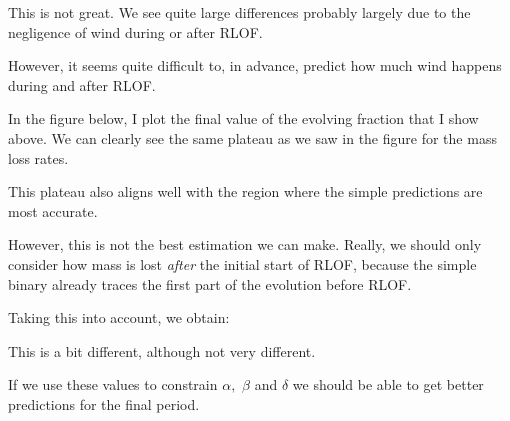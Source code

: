 \documentclass[a4paper,11pt]{article}
\begin{document}
This is not great.
We see quite large differences probably largely due to the negligence of wind
during or after RLOF.

However, it seems quite difficult to, in advance, predict how much wind happens during and after RLOF.

\begin{figure}[ht]
	\centering
\end{figure}

\begin{figure}[ht]
	\centering
\end{figure}

In the figure below, I plot the final value of the evolving fraction that I show above.
We can clearly see the same plateau as we saw in the figure for the mass loss rates.

\begin{figure}[ht]
	\centering
\end{figure}

This plateau also aligns well with the region where the simple predictions are most accurate.

However, this is not the best estimation we can make.
Really, we should only consider how mass is lost
\emph{after} the initial start of RLOF, because the simple binary already traces the first part of
the evolution before RLOF.

Taking this into account, we obtain:

\begin{figure}[ht]
	\centering
\end{figure}
This is a bit different, although not very different.

If we use these values to constrain \(\alpha,\) \(\beta \) and \(\delta \) we should
be able to get better predictions for the final period.
\end{document}
